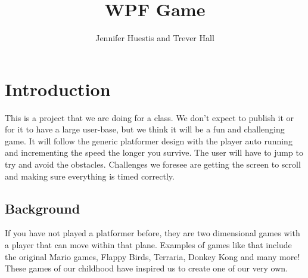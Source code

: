 \documentclass[10pt,conference,onecolumn,compsoc]{IEEEtran}
\begin{document}
\title{WPF Game}
%
%


\author{Jennifer Huestis and Trever Hall%
}



\maketitle



\IEEEdisplaynontitleabstractindextext

\IEEEpeerreviewmaketitle



\section{Introduction}

This is a project that we are doing for a class. We don't expect to publish it or for it to have a large user-base, but we think it will be a fun and challenging game. It will follow the generic platformer design with the player auto running and incrementing the speed the longer you survive. The user will have to jump to try and avoid the obstacles. Challenges we foresee are getting the screen to scroll and making sure everything is timed correctly.



\subsection{Background}
If you have not played a platformer before, they are two dimensional games with a player that can move within that plane. Examples of games like that include the original Mario games, Flappy Birds, Terraria, Donkey Kong and many more! These games of our childhood have inspired us to create one of our very own.
\end{document}
